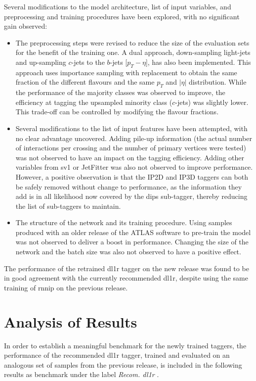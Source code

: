 Several modifications to the model architecture, list of input variables, and preprocessing and training procedures have been explored, with no significant gain observed:
\begin{itemize}
\item The preprocessing steps were revised to reduce the size of the evaluation sets for the benefit of the training one. A dual approach, down-sampling light-jets and up-sampling $c$-jets to the $b$-jets [$p_T - \eta$], has also been implemented. This approach uses importance sampling with replacement to obtain the same fraction of the different flavours and the same $p_T$ and $|\eta|$ distribution. While the performance of the majority classes was observed to improve, the efficiency at tagging the upsampled minority class ($c$-jets) was slightly lower. This trade-off can be controlled by modifying the flavour fractions. 
\item Several modifications to the list of input features have been attempted, with no clear advantage uncovered. Adding pile-up information (the actual number of interactions per crossing and the number of primary vertices were tested) was not observed to have an impact on the tagging efficiency. Adding other variables from \gls{sv1} or JetFitter was also not observed to improve performance. However, a positive observation is that the IP2D and IP3D taggers can both be safely removed without change to performance, as the information they add is in all likelihood now covered by the \gls{dips} sub-tagger, thereby reducing the list of sub-taggers to maintain.
\item The structure of the network and its training procedure. Using samples produced with an older release of the ATLAS software to pre-train the model was not observed to deliver a boost in performance. Changing the size of the network and the batch size was also not observed to have a positive effect.
\end{itemize}

The performance of the retrained \gls{dl1r} tagger on the new release was found to be in good agreement with the currently recommended \gls{dl1r}, despite using the same training of \gls{rnnip} on the previous release.  

\section{Analysis of Results}
In order to establish a meaningful benchmark for the newly trained taggers, the performance of the recommended \gls{dl1r} tagger, trained and evaluated on an analogous set of samples from the previous release, is included in the following results as benchmark under the label \textit{Recom. \gls{dl1r} }. \\

